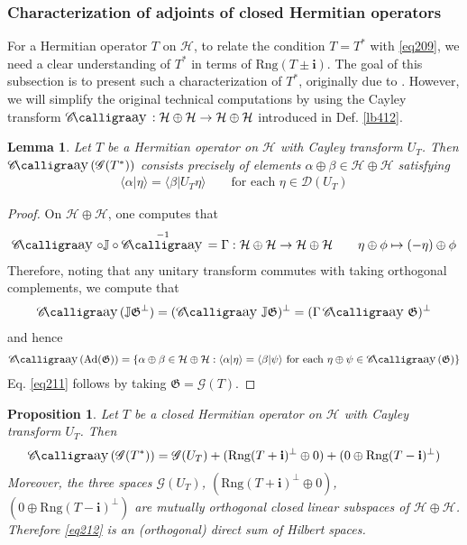 \documentclass[12pt,b5paper,notitlepage]{article}
\theoremstyle{definition}
\theoremstyle{plain}
\newtheorem{pp}[df]{Proposition}
\newtheorem{lm}[df]{Lemma}
\DeclareMathOperator{\Cay}{\mathscr{C}\text{\kern -3pt {\calligra\large ay}}\,}
\newcommand{\fk}{\mathfrak}
\newcommand{\Dom}{\mathscr{D}}
\newcommand{\bk}[1]{\langle {#1}\rangle}
\newcommand{\Ad}{\mathrm{Ad}}
\newcommand{\im}{\mathbf{i}}
\newcommand{\Jbb}{\mathbb J}
\newcommand{\Rng}{\mathrm{Rng}}
\newcommand{\MH}{\mathcal H}
\newcommand{\SG}{\mathscr G}
\numberwithin{equation}{section}
\begin{document}
 
\subsubsection{Characterization of adjoints of closed Hermitian operators}

For a Hermitian operator $T$ on $\MH$, to relate the condition $T=T^*$ with \eqref{eq209}, we need a clear understanding of $T^*$ in terms of $\Rng(T\pm\im)$. The goal of this subsection is to present such a characterization of $T^*$, originally due to \cite{vN29a}. However, we will simplify the original technical computations by using the Cayley transform $\Cay:\MH\oplus\MH\rightarrow\MH\oplus\MH$ introduced in Def. \ref{lb412}.


\begin{lm}\label{lb413}
Let $T$ be a Hermitian operator on $\MH$ with Cayley transform $U_T$. Then $\Cay(\SG(T^*))$ consists precisely of elements $\alpha\oplus\beta\in\MH\oplus\MH$ satisfying
\begin{align}\label{eq211}
\bk{\alpha|\eta}=\bk{\beta|U_T\eta}\qquad\text{for each }\eta\in\Dom(U_T)
\end{align}
\end{lm}


\begin{proof}
On $\MH\oplus\MH$, one computes that
\begin{align*}
\Cay\circ\Jbb\circ\Cay^{-1}=\Gamma:\MH\oplus\MH\rightarrow\MH\oplus\MH\qquad \eta\oplus\phi\mapsto(-\eta)\oplus\phi
\end{align*}
Therefore, noting that any unitary transform commutes with taking orthogonal complements, we compute that
\begin{align*}
\Cay(\Jbb\fk G^\perp)=(\Cay\Jbb\fk G)^\perp=(\Gamma\Cay\fk G)^\perp
\end{align*}
and hence
\begin{align}
\Cay(\Ad(\fk G))=\{\alpha\oplus\beta\in\MH\oplus\MH:\bk{\alpha|\eta}=\bk{\beta|\psi}\text{ for each }\eta\oplus\psi\in\Cay(\fk G)\}
\end{align}
Eq. \eqref{eq211} follows by taking $\fk G=\SG(T)$.
\end{proof}


\begin{pp}
Let $T$ be a closed Hermitian operator on $\MH$ with Cayley transform $U_T$. Then
\begin{align}\label{eq212}
\Cay(\SG(T^*))=\SG(U_T)+(\Rng(T+\im)^\perp\oplus 0)+(0\oplus\Rng(T-\im)^\perp)
\end{align}
Moreover, the three spaces $\SG(U_T)$, $(\Rng(T+\im)^\perp\oplus 0)$, $(0\oplus\Rng(T-\im)^\perp)$ are mutually orthogonal closed linear subspaces of $\MH\oplus\MH$. Therefore \eqref{eq212} is an (orthogonal) direct sum of Hilbert spaces.
\end{pp}
\end{document}
